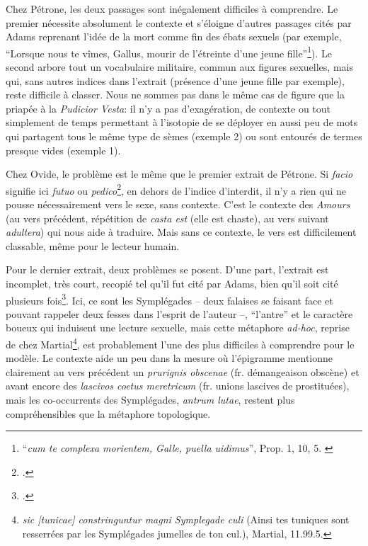 Chez Pétrone, les deux passages sont inégalement difficiles à comprendre. Le premier nécessite absolument le contexte et s'éloigne d'autres passages cités par Adams reprenant l'idée de la mort comme fin des ébats sexuels (par exemple, \enquote{Lorsque nous te vîmes, Gallus, mourir de l'étreinte d'une jeune fille}\footnote{\enquote{\textit{cum te complexa morientem, Galle, puella uidimus}}, Prop. 1, 10, 5. \textcite[p.159]{adams}}). Le second arbore tout un vocabulaire militaire, commun aux figures sexuelles, mais qui, sans autres indices dans l'extrait (présence d'une jeune fille par exemple), reste difficile à classer. Nous ne sommes pas dans le même cas de figure que la priapée à la \textit{Pudicior Vesta}: il n'y a pas d'exagération, de contexte ou tout simplement de temps permettant à l'isotopie de se déployer en aussi peu de mots qui partagent tous le même type de sèmes (exemple 2) ou sont entourés de termes presque vides (exemple 1).

Chez Ovide, le problème est le même que le premier extrait de Pétrone. Si \textit{facio} signifie ici \textit{futuo} ou \textit{pedico}\footcite[p.204]{adams}, en dehors de l'indice d'interdit, il n'y a rien qui ne pousse nécessairement vers le sexe, sans contexte. C'est le contexte des \textit{Amours} (au vers précédent, répétition de \textit{casta est} (elle est chaste), au vers suivant \textit{adultera}) qui nous aide à traduire. Mais sans ce contexte, le vers est difficilement classable, même pour le lecteur humain.

Pour le dernier extrait, deux problèmes se posent. D'une part, l'extrait est incomplet, très court, recopié tel qu'il fut cité par Adams, bien qu'il soit cité plusieurs fois\footcite[pp.114, 172 et 240]{adams}. Ici, ce sont les Symplégades -- deux falaises se faisant face et pouvant rappeler deux fesses dans l'esprit de l'auteur --, ``l'antre'' et le caractère boueux qui induisent une lecture sexuelle, mais cette métaphore \textit{ad-hoc}, reprise de chez Martial\footnote{\textit{sic {[tunicae]} constringuntur magni Symplegade culi} (Ainsi tes tuniques sont resserrées par les Symplégades jumelles de ton cul.), Martial, 11.99.5.}, est probablement l'une des plus difficiles à comprendre pour le modèle. Le contexte aide un peu dans la mesure où l'épigramme mentionne clairement au vers précédent un \textit{prurignis obscenae} (fr. démangeaison obscène) et avant encore des \textit{lascivos coetus meretricum} (fr. unions lascives de prostituées), mais les co-occurrents des Symplégades, \textit{antrum lutae}, restent plus compréhensibles que la métaphore topologique.

